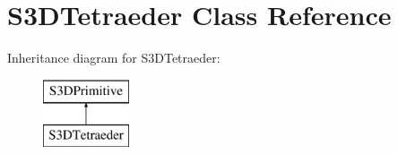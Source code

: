 \hypertarget{class_s3_d_tetraeder}{
\section{S3DTetraeder Class Reference}
\label{class_s3_d_tetraeder}
}
Inheritance diagram for S3DTetraeder:\begin{figure}[H]
\begin{center}
\leavevmode
\includegraphics[height=2cm]{class_s3_d_tetraeder}
\end{center}
\end{figure}
